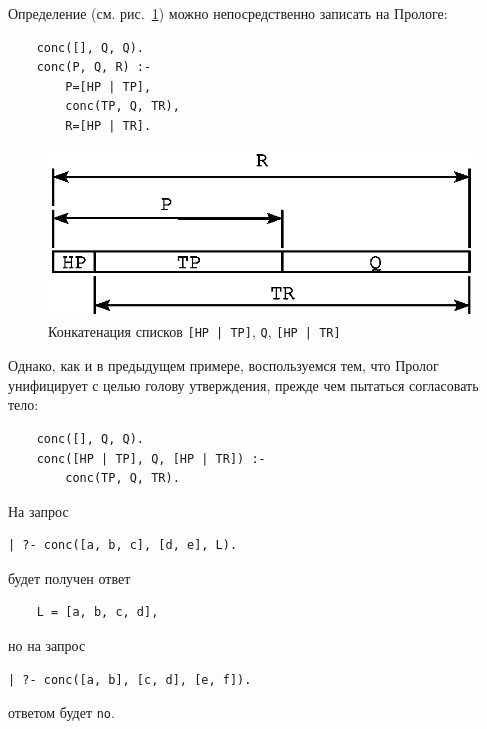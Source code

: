 \documentclass[12pt, openany, twoside]{book} %
\begin{document}
Определение (см. рис.~\ref{pic:list_descr}) можно непосредственно записать на Прологе:
{\tt\begin{verbatim}
    conc([], Q, Q).
    conc(Р, Q, R) :-
        Р=[НР | ТР],
        conc(TP, Q, TR),
        R=[HP | TR].
\end{verbatim}}

\begin{figure}[hbt]
\begin{center}
\includegraphics[scale=0.7]{pics/list_descr.eps}
\end{center}
\caption{Конкатенация списков {\tt [HP | TP]}, {\tt Q}, {\tt [HP | TR]}}
\label{pic:list_descr}
\end{figure}

\noindent Однако, как и в предыдущем примере, воспользуемся тем, что Пролог унифицирует с целью голову утверждения, прежде чем пытаться согласовать тело:
{\tt\begin{verbatim}
    conc([], Q, Q).
    conc([HP | TP], Q, [HP | TR]) :-
        conc(TP, Q, TR).
\end{verbatim}}
\noindent На запрос
{\tt\begin{verbatim}
| ?- conc([а, b, с], [d, e], L).
\end{verbatim}}

\noindent будет получен ответ
{\tt\begin{verbatim}
    L = [a, b, c, d],
\end{verbatim}}
\noindent но на запрос
{\tt\begin{verbatim}
| ?- conc([a, b], [c, d], [e, f]).
\end{verbatim}}
\noindent ответом будет {\tt no}.
\end{document}
